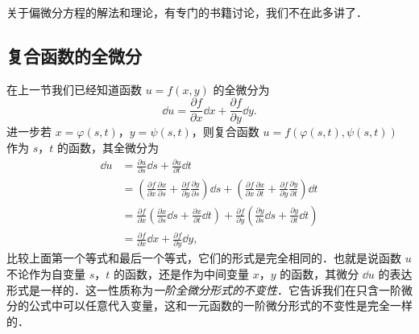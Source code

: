 关于偏微分方程的解法和理论，有专门的书籍讨论，我们不在此多讲了．

\subsection{复合函数的全微分}

在上一节我们已经知道函数 $u=f(x,y)$ 的全微分为
\[
\dd u=\frac{\partial f}{\partial x}\dd x+\frac{\partial f}{\partial y}\dd y.
\]
进一步若 $x=\varphi(s,t)$，$y=\psi(s,t)$，则复合函数 $u=f(\varphi(s,t),\psi(s,t))$ 作为 $s$，$t$ 的函数，其全微分为
\[
\begin{aligned}
\dd u&=\frac{\partial u}{\partial s}\dd s+\frac{\partial u}{\partial t}\dd t\\
&=\left(\frac{\partial f}{\partial x}\frac{\partial x}{\partial s}+\frac{\partial f}{\partial y}\frac{\partial y}{\partial s}\right)\dd s+\left(\frac{\partial f}{\partial x}\frac{\partial x}{\partial t}+\frac{\partial f}{\partial y}\frac{\partial y}{\partial t}\right)\dd t\\
&=\frac{\partial f}{\partial x}\left(\frac{\partial x}{\partial s}\dd s+\frac{\partial x}{\partial t}\dd t\right)+\frac{\partial f}{\partial y}\left(\frac{\partial y}{\partial s}\dd s+\frac{\partial y}{\partial t}\dd t\right)\\
&=\frac{\partial f}{\partial x}\dd x+\frac{\partial f}{\partial y}\dd y,
\end{aligned}
\]
比较上面第一个等式和最后一个等式，它们的形式是完全相同的．也就是说函数 $u$ 不论作为自变量 $s$，$t$ 的函数，还是作为中间变量 $x$，$y$ 的函数，其微分 $\dd u$ 的表达形式是一样的．这一性质称为\emph{一阶全微分形式的不变性}．它告诉我们在只含一阶微分的公式中可以任意代入变量，这和一元函数的一阶微分形式的不变性是完全一样的．

